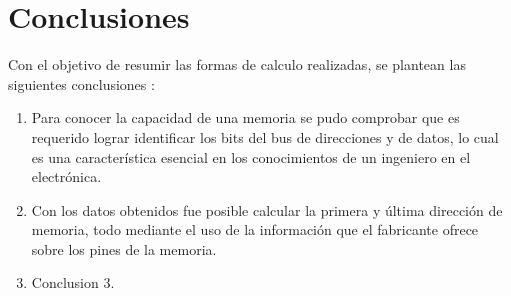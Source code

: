 \documentclass[../Main]{subfiles}
\begin{document}
    \chapter{Conclusiones}
        Con el objetivo de resumir las formas de calculo realizadas, se plantean las siguientes conclusiones \cite{documentoTarea1}:
        \begin{enumerate}
            \item Para conocer la capacidad de una memoria se pudo comprobar que es requerido lograr identificar los bits del bus de direcciones y de datos, lo cual es una característica esencial en los conocimientos de un ingeniero en el electrónica.
            \item Con los datos obtenidos fue posible calcular la primera y última dirección de memoria, todo mediante el uso de la información que el fabricante ofrece sobre los pines de la memoria.
            \item Conclusion 3.
        \end{enumerate}
\end{document}
